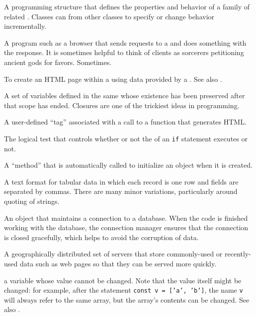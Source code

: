 \begin{description}
A programming structure that defines the properties and behavior of a family
of related . Classes can  from other
classes to specify or change behavior incrementally.

A program such as a browser that sends requests to a  and
does something with the response. It is sometimes helpful to think of clients
as sorcerers petitioning ancient gods for favors. Sometimes.

To create an HTML page within a  using data provided by a
. See also .

A set of variables defined in the same  whose existence has
been preserved after that scope has ended. Closures are one of the trickiest
ideas in programming.

A user-defined ``tag'' associated with a call to a function that generates HTML.

The logical test that controls whether or not the 
of an \texttt{if} statement executes or not.

A ``method'' that is automatically called to initialize an object when it is created.

A text format for tabular data in which each record is one row and fields are
separated by commas. There are many minor variations, particularly around
quoting of strings.

An object that maintains a connection to a database. When the code is
finished working with the database, the connection manager ensures that the
connection is closed gracefully, which helps to avoid the corruption of data.

A geographically distributed set of servers that store commonly-used or
recently-used data such as web pages so that they can be served more quickly.

a variable whose value cannot be changed. Note that the value itself might be
changed: for example, after the statement \texttt{const\ v\ =\ ['a',\ 'b']}, the name \texttt{v}
will always refer to the same array, but the array's contents can be changed.
See also .


\end{description}
